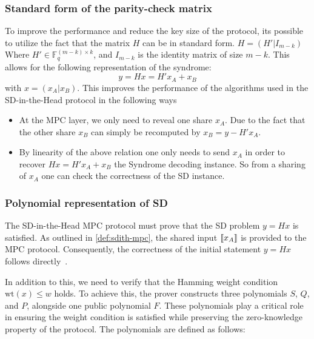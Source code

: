 \documentclass[11pt]{report}
\theoremstyle{definition}
\theoremstyle{plain}
\begin{document}
\subsubsection{Standard form of the parity-check matrix}\label{sub:standard_form_of_the_parity_check_matrix}
To improve the performance and reduce the key size of the protocol, its possible to utilize the fact that the matrix $H$ can be in standard form. $H = (H'|I_{m-k}) $ Where $H' \in \mathbb{F}^{(m-k)\times k}_q$, and $I_{m-k}$ is the identity matrix of size $m-k$. This allows for the following representation of the syndrome:
\begin{equation}
  y = Hx = H'x_A + x_B\label{eq:standard_form_of_the_parity_check_matrix}
\end{equation}
with $x = (x_A | x_B)$. This improves the performance of the algorithms used in the SD-in-the-Head protocol in the following ways
\begin{itemize}
  \item At the MPC layer, we only need to reveal one share $x_A$. Due to the fact that the other share $x_B$ can simply be recomputed by $x_B = y - H'x_A$.
  \item By linearity of the above relation one only needs to send $x_A$ in order to recover $Hx = H'x_A + x_B$ the Syndrome decoding instance. So from a sharing of $x_A$ one can check the correctness of the SD instance.
\end{itemize}

\subsubsection{Polynomial representation of SD}\label{sec:polynomial_representation}

The SD-in-the-Head MPC protocol must prove that the SD problem \( y = Hx \) is satisfied. As outlined in \autoref{def:sdith-mpc}, the shared input \(\llbracket x_A \rrbracket\) is provided to the MPC protocol. Consequently, the correctness of the initial statement \( y = Hx \) follows directly~\cite{feneuil2022syndrome}.

In addition to this, we need to verify that the Hamming weight condition \( \text{wt}(x) \leq w \) holds. To achieve this, the prover constructs three polynomials \( S \), \( Q \), and \( P \), alongside one public polynomial \( F \). These polynomials play a critical role in ensuring the weight condition is satisfied while preserving the zero-knowledge property of the protocol. The polynomials are defined as follows:
\end{document}
